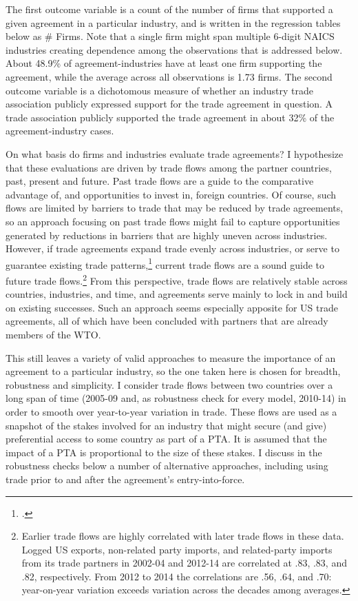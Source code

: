 \documentclass[hidelinks,12pt,letter]{article}
\begin{document}
The first outcome variable is a count of the number of firms that supported a given agreement in a particular industry, and is written in the regression tables below as $\#$ Firms. Note that a single firm might span multiple 6-digit NAICS industries creating dependence among the observations that is addressed below. About 48.9\% of agreement-industries have at least one firm supporting the agreement, while the average across all observations is 1.73 firms. The second outcome variable is a dichotomous measure of whether an industry trade association publicly expressed support for the trade agreement in question. A trade association publicly supported the trade agreement in about 32\% of the agreement-industry cases. 

On what basis do firms and industries evaluate trade agreements? I hypothesize that these evaluations are driven by trade flows among the partner countries, past, present and future. Past trade flows are a guide to the comparative advantage of, and opportunities to invest in, foreign countries. Of course, such flows are limited by barriers to trade that may be reduced by trade agreements, so an approach focusing on past trade flows might fail to capture opportunities generated by reductions in barriers that are highly uneven across industries. However, if trade agreements expand trade evenly across industries, or serve to guarantee existing trade patterns,\footnote{\citealt{mansfield2008international}.} current trade flows are a sound guide to future trade flows.\footnote{Earlier trade flows are highly correlated with later trade flows in these data. Logged US exports, non-related party imports, and related-party imports from its trade partners in 2002-04 and 2012-14 are correlated at .83, .83, and .82, respectively. From 2012 to 2014 the correlations are .56, .64, and .70: year-on-year variation exceeds variation across the decades among averages.} From this perspective, trade flows are relatively stable across countries, industries, and time, and agreements serve mainly to lock in and build on existing successes. Such an approach seems especially apposite for US trade agreements, all of which have been concluded with partners that are already members of the WTO. 

This still leaves a variety of valid approaches to measure the importance of an agreement to a particular industry, so the one taken here is chosen for breadth, robustness and simplicity. I consider trade flows between two countries over a long span of time (2005-09 and, as robustness check for every model, 2010-14) in order to smooth over year-to-year variation in trade. These flows are used as a snapshot of the stakes involved for an industry that might secure (and give) preferential access to some country as part of a PTA. It is assumed that the impact of a PTA is proportional to the size of these stakes. %
I discuss in the robustness checks below a number of alternative approaches, including using trade prior to and after the agreement's entry-into-force.
\end{document}
